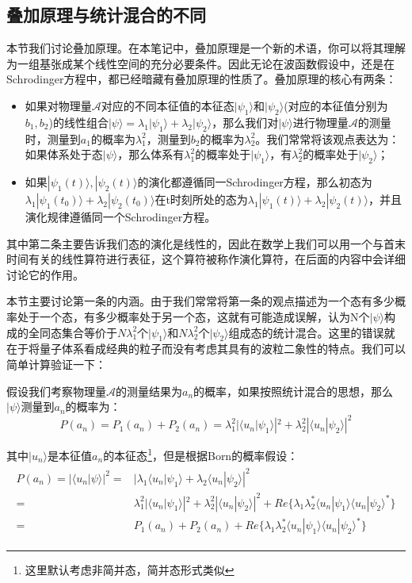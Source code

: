     \subsection{叠加原理与统计混合的不同}
    本节我们讨论叠加原理。在本笔记中，叠加原理是一个新的术语，你可以将其理解为一组基张成某个线性空间的充分必要条件。因此无论在波函数假设中，还是在Schrodinger方程中，都已经暗藏有叠加原理的性质了。叠加原理的核心有两条：
    \begin{itemize}
        \item 如果对物理量$\mathscr{A}$对应的不同本征值的本征态$|\psi_1\rangle$和$|\psi_2\rangle$(对应的本征值分别为$b_1,b_2$)的线性组合$|\psi\rangle=\lambda_1|\psi_1\rangle+\lambda_2|\psi_2\rangle$，那么我们对$|\psi\rangle$进行物理量$\mathscr{A}$的测量时，测量到$a_1$的概率为$\lambda_1^2$，测量到$b_2$的概率为$\lambda_2^2$。我们常常将该观点表达为：如果体系处于态$|\psi\rangle$，那么体系有$\lambda_1^2$的概率处于$|\psi_1\rangle$，有$\lambda_2^2$的概率处于$|\psi_2\rangle$；
        \item 如果$|\psi_1(t)\rangle,|\psi_2(t)\rangle$的演化都遵循同一Schrodinger方程，那么初态为$\lambda_1|\psi_1(t_0)\rangle+\lambda_2|\psi_2(t_0)\rangle$在t时刻所处的态为$\lambda_1|\psi_1(t)\rangle+\lambda_2|\psi_2(t)\rangle$，并且演化规律遵循同一个Schrodinger方程。
    \end{itemize}
    
    其中第二条主要告诉我们态的演化是线性的，因此在数学上我们可以用一个与首末时间有关的线性算符进行表征，这个算符被称作演化算符，在后面的内容中会详细讨论它的作用。
    
    本节主要讨论第一条的内涵。由于我们常常将第一条的观点描述为一个态有多少概率处于一个态，有多少概率处于另一个态，这就有可能造成误解，认为N个$|\psi\rangle$构成的全同态集合等价于$N\lambda_1^2$个$|\psi_1\rangle$和$N\lambda_2^2$个$|\psi_2\rangle$组成态的统计混合。这里的错误就在于将量子体系看成经典的粒子而没有考虑其具有的波粒二象性的特点。我们可以简单计算验证一下：
    
    假设我们考察物理量$\mathscr{A}$的测量结果为$a_n$的概率，如果按照统计混合的思想，那么$|\psi\rangle$测量到$a_n$的概率为：
    \begin{equation}
        P(a_n)=P_1(a_n)+P_2(a_n)=\lambda_1^2|\langle u_n|\psi_1\rangle|^2+\lambda_2^2|\langle u_n|\psi_2\rangle|^2
    \end{equation}
    
    其中$|u_n\rangle$是本征值$a_n$的本征态\footnote{这里默认考虑非简并态，简并态形式类似}，但是根据Born的概率假设：
    \begin{align}
        \begin{split}
            P(a_n)=|\langle u_n|\psi\rangle|^2=&|\lambda_1\langle u_n|\psi_1\rangle+\lambda_2\langle u_n|\psi_2\rangle|^2\\
            =&\lambda_1^2|\langle u_n|\psi_1\rangle|^2+\lambda_2^2|\langle u_n|\psi_2\rangle|^2+Re\{\lambda_1\lambda_2^*\langle u_n|\psi_1\rangle\langle u_n|\psi_2\rangle^*\}\\
            =& P_1(a_n)+P_2(a_n)+Re\{\lambda_1\lambda_2^*\langle u_n|\psi_1\rangle\langle u_n|\psi_2\rangle^*\}
        \end{split}
    \end{align}
    
